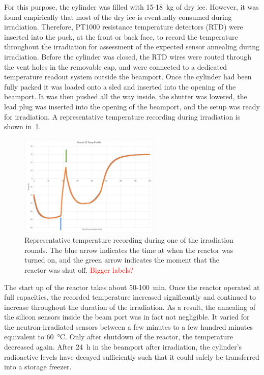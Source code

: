 For this purpose, the cylinder was filled with 15-\SI{18}{\kilo\gram} of dry ice.
However, it was found empirically that most of the dry ice is eventually consumed during irradiation.
Therefore, PT1000 resistance temperature detectors (RTD) were inserted into the puck, at the front or back face, to record the temperature throughout the irradiation for assessment of the expected sensor annealing during irradiation.
Before the cylinder was closed, the RTD wires were routed through the vent holes in the removable cap, and were connected to a dedicated temperature readout system outside the beamport.\newline 
Once the cylinder had been fully packed it was loaded onto a sled and inserted into the opening of the beamport.
It was then pushed all the way inside, the shutter was lowered, the lead plug was inserted into the opening of the beamport, and the setup was ready for irradiation.\newline
A representative temperature recording during irradiation is shown in~\ref{fig:Round_10_Temperature_Profile}.
\begin{figure}[!hbt]
  \begin{center}
    \includegraphics[width=0.60\textwidth]{figures/Round_10_Temperature_Profile}
    \caption{Representative temperature recording during one of the irradiation rounds. 
    The blue arrow indicates the time at when the reactor was turned on, and the green arrow indicates the moment that the reactor was shut off.
    \textcolor{red}{Bigger labels?}
    }
    \label{fig:Round_10_Temperature_Profile}
  \end{center}
\end{figure}
The start up of the reactor takes about 50-\SI{100}{\minute}. 
Once the reactor operated at full capacities, the recorded temperature increased significantly and continued to increase throughout the duration of the irradiation.
As a result, the annealing of the silicon sensors inside the beam port was in fact not negligible.
It varied for the neutron-irradiated sensors between a few minutes to a few hundred minutes equivalent to \SI{60}{\celsius}.
Only after shutdown of the reactor, the temperature decreased again.
After \SI{24}{\hour} in the beamport after irradiation, the cylinder's radioactive levels have decayed sufficiently such that it could safely be transferred into a storage freezer.

